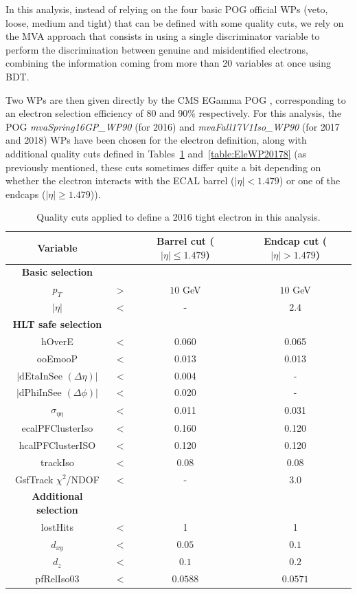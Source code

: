 \documentclass[a4paper, 10pt, openright]{report}
\begin{document}
In this analysis, instead of relying on the four basic \ac{POG} official \acp{WP} (veto, loose, medium and tight) that can be defined with some quality cuts, we rely on the \ac{MVA} approach that consists in using a single discriminator variable to perform the discrimination between genuine and misidentified electrons, combining the information coming from more than 20 variables at once using \ac{BDT}. 

Two \acp{WP} are then given directly by the \ac{CMS} EGamma \ac{POG} \cite{ElePOG}, corresponding to an electron selection efficiency of 80 and 90\% respectively. For this analysis, the \ac{POG} \textit{mvaSpring16GP\_WP90} (for 2016) and \textit{mvaFall17V1Iso\_WP90} (for 2017 and 2018) \acp{WP} have been chosen for the electron definition, along with additional quality cuts defined in Tables~\ref{table:EleWP2016} and~\ref{table:EleWP20178} (as previously mentioned, these cuts sometimes differ quite a bit depending on whether the electron interacts with the \ac{ECAL} barrel ($|\eta| < 1.479$) or one of the endcaps ($|\eta| \geq 1.479$)).

\begin{table}
\begin{center}
\begin{tabular}{ c|c|c|c } 
 \hline
 Variable & & Barrel cut ($|\eta| \leq 1.479$) & Endcap cut ($|\eta| > 1.479$) \\
\hline
\textbf{Basic selection} & &  \\ 
$p_T$ & $>$ & $10$ GeV & $10$ GeV \\
 $|\eta|$ & $<$ & - & $2.4$ \\
 \hline
\textbf{\ac{HLT} safe selection} & &  \\ 
hOverE & $<$ & 0.060 & 0.065 \\
 ooEmooP & $<$ & 0.013 & 0.013 \\
 $|\text{dEtaInSee } (\Delta \eta)|$ & $<$ & 0.004 & - \\  
 $|\text{dPhiInSee } (\Delta \phi)|$ & $<$ & 0.020 & - \\  
  $\sigma_{\eta \eta}$ & $<$ & 0.011 & 0.031 \\
  ecalPFClusterIso & $<$ & 0.160 & 0.120 \\
  hcalPFClusterISO & $<$ & 0.120 & 0.120 \\
  trackIso & $<$ & 0.08 & 0.08 \\
  GsfTrack $\chi^2$/NDOF & $<$ & - & 3.0 \\
 	\hline
 	\textbf{Additional selection} & &  \\ 
 lostHits & $<$ & 1 & 1 \\
 $d_{xy}$ & $<$ &  $0.05$ & $0.1$ \\
 $d_z$ & $<$ & $0.1$ & $0.2$ \\
 pfRelIso03 & $<$ & $0.0588$ & $0.0571$ \\
\hline
\end{tabular}
\caption{Quality cuts applied to define a 2016 tight electron in this analysis.}
\label{table:EleWP2016}
\end{center}
\end{table}	
\end{document}
